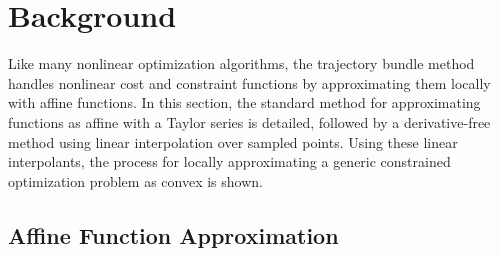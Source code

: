 




\section{Background}\label{sec:bundles:background}
Like many nonlinear optimization algorithms, the trajectory bundle method handles nonlinear cost and constraint functions by approximating them locally with affine functions. In this section, the standard method for approximating functions as affine with a Taylor series is detailed, followed by a derivative-free method using linear interpolation over sampled points.  Using these linear interpolants, the process for locally approximating a generic constrained optimization problem as convex is shown. 
%
%
\subsection{Affine Function Approximation}\label{btb:sect:interp}
%
%



